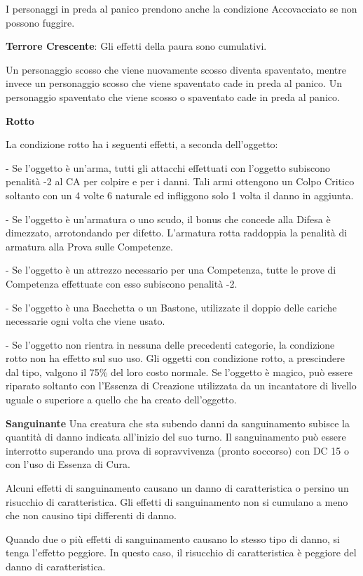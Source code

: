 \documentclass[a4paper,11pt,twoside,openany]{book}
\begin{document}
I personaggi in preda al panico prendono anche la condizione Accovacciato se non possono fuggire.

\textbf{Terrore Crescente}: Gli effetti della paura sono cumulativi.

Un personaggio scosso che viene nuovamente scosso diventa spaventato, mentre invece un personaggio scosso che viene spaventato cade in preda al panico. Un personaggio spaventato che viene scosso o spaventato cade in preda al panico.

\textbf{Rotto}

La condizione rotto ha i seguenti effetti, a seconda dell'oggetto:

- Se l'oggetto è un'arma, tutti gli attacchi effettuati con l'oggetto subiscono penalità -2 al CA per colpire e per i danni. Tali armi ottengono un Colpo Critico soltanto con un 4 volte 6 naturale ed infliggono solo 1 volta il danno in aggiunta.

- Se l'oggetto è un'armatura o uno scudo, il bonus che concede alla Difesa è dimezzato, arrotondando per difetto. L'armatura rotta raddoppia la penalità di armatura alla Prova sulle Competenze.

- Se l'oggetto è un attrezzo necessario per una Competenza, tutte le prove di Competenza effettuate con esso subiscono penalità -2.

- Se l'oggetto è una Bacchetta o un Bastone, utilizzate il doppio delle cariche necessarie ogni volta che viene usato.

- Se l'oggetto non rientra in nessuna delle precedenti categorie, la condizione rotto non ha effetto sul suo uso. Gli oggetti con condizione rotto, a prescindere dal tipo, valgono il 75\% del loro costo normale. Se l'oggetto è magico, può essere riparato soltanto con l'Essenza di Creazione utilizzata da un incantatore di livello uguale o superiore a quello che ha creato dell'oggetto.

\textbf{Sanguinante} Una creatura che sta subendo danni da sanguinamento subisce la quantità di danno indicata all'inizio del suo turno. Il sanguinamento può essere interrotto superando una prova di sopravvivenza (pronto soccorso) con DC 15 o con l'uso di Essenza di Cura.

Alcuni effetti di sanguinamento causano un danno di caratteristica o persino un risucchio di caratteristica. Gli effetti di sanguinamento non si cumulano a meno che non causino tipi differenti di danno.

Quando due o più effetti di sanguinamento causano lo stesso tipo di danno, si tenga l'effetto peggiore. In questo caso, il risucchio di caratteristica è peggiore del danno di caratteristica.
\end{document}
